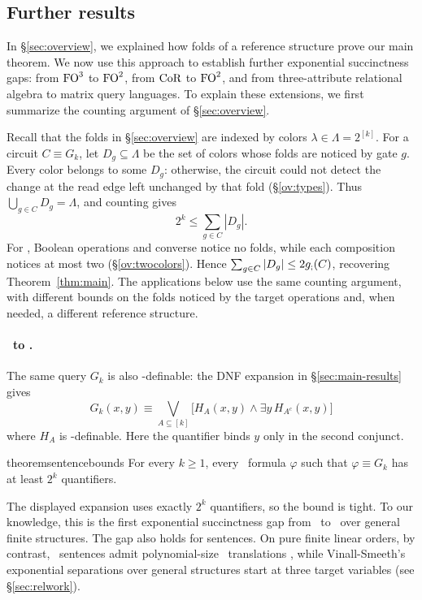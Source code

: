 \subsection{Further results}\label{sec:additional-results}
In \S\ref{sec:overview}, we explained how folds of a reference structure
prove our main theorem. We now use this approach to establish further
exponential succinctness gaps: from $\mathrm{FO}^{3}$ to $\mathrm{FO}^{2}$, from
$\mathrm{CoR}$ to $\mathrm{FO}^{2}$, and from three-attribute relational algebra to
matrix query languages. To explain these extensions, we first summarize
the counting argument of \S\ref{sec:overview}.

Recall that the folds in \S\ref{sec:overview} are indexed by colors $\lambda\in\Lambda=2^{[k]}$.
For a circuit $C \equiv G_k$,
let $D_g\subseteq\Lambda$ be the set of colors whose folds are noticed by gate $g$.
Every color belongs to some $D_g$: otherwise, the circuit
could not detect the change at the read edge left unchanged by that
fold (\S\ref{ov:types}). Thus $\bigcup_{g\in C}D_g=\Lambda$, and
counting gives
\begin{equation}\tag{$\dagger$}\label{eq:fold-counting}
  2^k\le \sum_{g\in C}|D_g|.
\end{equation}
For \CoR, Boolean operations and converse notice no folds, while each
composition notices at most two (\S\ref{ov:twocolors}). Hence
$\sum_{g\in C}|D_g|\le 2g_{;}(C)$, recovering Theorem~\ref{thm:main}.
The applications below use the same counting argument, with different
bounds on the folds noticed by the target operations and, when needed,
a different reference structure.

\paragraph{\texorpdfstring{{\boldmath\FOthree\ to \FOtwo}}{FO3 to FO2}.}
The same query $G_k$ is also \FOtwo-definable: the DNF expansion in
\S\ref{sec:main-results} gives
\[
 G_k(x,y)\equiv\bigvee_{A\subseteq[k]}
 \bigl[H_A(x,y)\land\exists y\,H_{A^c}(x,y)\bigr]
\]
where $H_A$ is \FOtwo-definable.
Here the quantifier binds $y$ only in the second conjunct.
\begin{restatable}{theorem}{sentencebounds}\label{cor:sentences}
For every $k\ge1$,
every \FOtwo\ formula $\varphi$ such that $\varphi\equiv G_k$ has at least $2^k$ quantifiers.

\end{restatable}
The displayed expansion uses exactly $2^k$ quantifiers, so the bound
is tight. To our knowledge, this is the first exponential succinctness
gap from \FOthree\ to \FOtwo\ over general finite structures. The gap
also holds for sentences. On pure finite linear orders, by contrast,
\FOthree\ sentences admit polynomial-size \FOtwo\ translations
\citep{grohe-schweikardt2005}, while Vinall-Smeeth's exponential
separations over general structures start at three target variables
\citep{vinall-smeeth2024} (see \S\ref{sec:relwork}).

